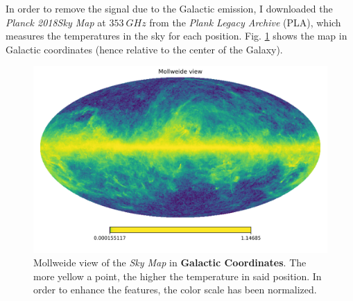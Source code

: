 \documentclass[12pt,a4paper,final]{book}			%
\begin{document}
		In order to remove the signal due to the Galactic emission, I downloaded the \textit{Planck 2018}\textit{Sky Map} at $353~\unit{GHz}$ from the \textit{Plank Legacy Archive} (PLA), which measures the temperatures in the sky for each position. Fig. \ref{sky_map_galactic} shows the map in Galactic coordinates (hence relative to the center of the Galaxy).
	\begin{figure}[t]
			\centering
			\includegraphics[scale=0.6]{figures/galactic_galaxy_map.png}
		\caption{Mollweide view of the\textit{ Sky Map} in \textbf{Galactic Coordinates}. The more yellow a point, the higher the temperature in said position. In order to enhance the features, the color scale has been normalized.}
		\label{sky_map_galactic}
		\end{figure}	
		
\end{document}
